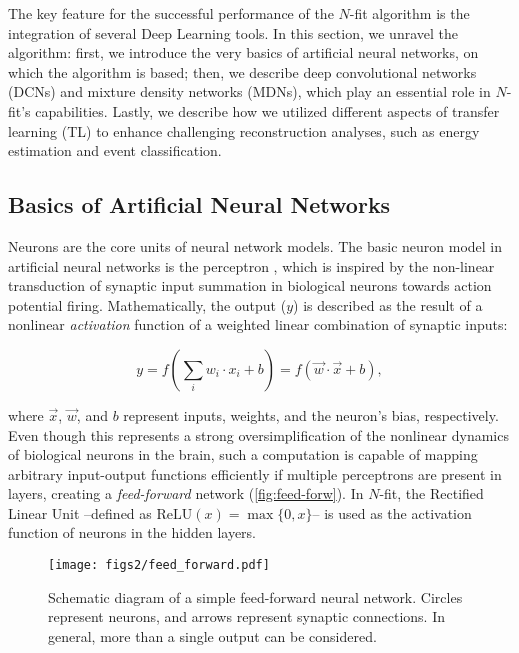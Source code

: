 The key feature for the successful performance of the $N$-fit algorithm is the integration of several Deep Learning tools. In this section, we unravel the algorithm: first, we introduce the very basics of artificial neural networks, on which the algorithm is based; then, we describe deep convolutional networks (DCNs) and mixture density networks (MDNs), which play an essential role in $N$-fit's capabilities. Lastly, we describe how we utilized different aspects of transfer learning (TL) to enhance challenging reconstruction analyses, such as energy estimation and event classification.

\subsection{Basics of Artificial Neural Networks}
\label{subsec:ANNs}

Neurons are the core units of neural network models. The basic neuron model in artificial neural networks is the perceptron \cite{perceptron}, which is inspired by the non-linear transduction of synaptic input summation in biological neurons towards action potential firing. Mathematically, the output ($y$) is described as the result of a nonlinear \textit{activation} function of a weighted linear combination of synaptic inputs:

\begin{equation}
	\label{eq:perceptron}
	y = f\left( \sum_i w_i \cdot x_i + b \right) =  f\left( \vec{w}\cdot\vec{x} +b \right),
\end{equation}

where $\vec{x}$, $\vec{w}$, and $b$ represent inputs, weights, and the neuron's bias, respectively. Even though this represents a strong oversimplification of the nonlinear dynamics of biological neurons in the brain, such a computation is capable of mapping arbitrary input-output functions efficiently if multiple perceptrons are present in layers, creating a \textit{feed-forward} network (\autoref{fig:feed-forw}). In $N$-fit, the Rectified Linear Unit \cite{relu} --defined as $\mathrm{ReLU}(x)=\max\{0,x\}$-- is used as the activation function of neurons in the hidden layers.

\begin{figure}[htbp]
	\centering
	\texttt{[image: figs2/feed\_forward.pdf]}
	\caption{\label{fig:feed-forw}Schematic diagram of a simple feed-forward neural network. Circles represent neurons, and arrows represent synaptic connections. In general, more than a single output can be considered.}
\end{figure}


